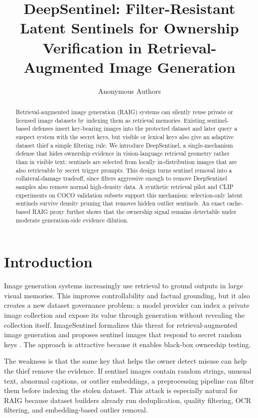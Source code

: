 \documentclass[letterpaper]{article}
\title{DeepSentinel: Filter-Resistant Latent Sentinels for Ownership Verification in Retrieval-Augmented Image Generation}
\author{Anonymous Authors}
\begin{document}
\maketitle

\begin{abstract}
Retrieval-augmented image generation (RAIG) systems can silently reuse private
or licensed image datasets by indexing them as retrieval memories. Existing
sentinel-based defenses insert key-bearing images into the protected dataset and
later query a suspect system with the secret keys, but visible or lexical keys
also give an adaptive dataset thief a simple filtering rule. We introduce
DeepSentinel, a single-mechanism defense that hides ownership evidence in
vision-language retrieval geometry rather than in visible text: sentinels are
selected from locally in-distribution images that are also retrievable by secret
trigger prompts. This design turns sentinel removal into a
collateral-damage tradeoff, since filters aggressive enough to remove
DeepSentinel samples also remove normal high-density data. A synthetic retrieval
pilot and CLIP experiments on COCO validation subsets support this mechanism:
selection-only latent sentinels survive density pruning that removes hidden
outlier sentinels. An exact cache-based RAIG proxy further shows that the
ownership signal remains detectable under moderate generation-side evidence
dilution.
\end{abstract}

\section{Introduction}

Image generation systems increasingly use retrieval to ground outputs in large
visual memories. This improves controllability and factual grounding, but it
also creates a new dataset governance problem: a model provider can index a
private image collection and expose its value through generation without
revealing the collection itself. ImageSentinel formalizes this threat for
retrieval-augmented image generation and proposes sentinel images that respond
to secret random keys \cite{imagesentinel2025}. The approach is attractive
because it enables black-box ownership testing.

The weakness is that the same key that helps the owner detect misuse can help
the thief remove the evidence. If sentinel images contain random strings,
unusual text, abnormal captions, or outlier embeddings, a preprocessing pipeline
can filter them before indexing the stolen dataset. This attack is especially
natural for RAIG because dataset builders already run deduplication, quality
filtering, OCR filtering, and embedding-based outlier removal.
\end{document}

